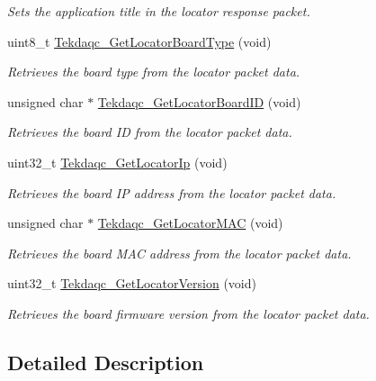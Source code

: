 \begin{DoxyCompactItemize}
\begin{DoxyCompactList}\small\item\em Sets the application title in the locator response packet. \end{DoxyCompactList}\item 
uint8\-\_\-t \hyperlink{group__tekdaqc__locator_ga573f8960093dc2ab0cc4c88b8f8c6ff9}{Tekdaqc\-\_\-\-Get\-Locator\-Board\-Type} (void)
\begin{DoxyCompactList}\small\item\em Retrieves the board type from the locator packet data. \end{DoxyCompactList}\item 
unsigned char $\ast$ \hyperlink{group__tekdaqc__locator_gae38557024fc843c693d4b6f2cdb5d097}{Tekdaqc\-\_\-\-Get\-Locator\-Board\-I\-D} (void)
\begin{DoxyCompactList}\small\item\em Retrieves the board I\-D from the locator packet data. \end{DoxyCompactList}\item 
uint32\-\_\-t \hyperlink{group__tekdaqc__locator_gaf8eaedaeca86f0d5c7af113faebe16a0}{Tekdaqc\-\_\-\-Get\-Locator\-Ip} (void)
\begin{DoxyCompactList}\small\item\em Retrieves the board I\-P address from the locator packet data. \end{DoxyCompactList}\item 
unsigned char $\ast$ \hyperlink{group__tekdaqc__locator_ga03c9656c9876829e12f617d4e4abef04}{Tekdaqc\-\_\-\-Get\-Locator\-M\-A\-C} (void)
\begin{DoxyCompactList}\small\item\em Retrieves the board M\-A\-C address from the locator packet data. \end{DoxyCompactList}\item 
uint32\-\_\-t \hyperlink{group__tekdaqc__locator_ga502ebd4cceffc0fa3a7abefc7f79b42a}{Tekdaqc\-\_\-\-Get\-Locator\-Version} (void)
\begin{DoxyCompactList}\small\item\em Retrieves the board firmware version from the locator packet data. \end{DoxyCompactList}\end{DoxyCompactItemize}


\subsection{Detailed Description}


